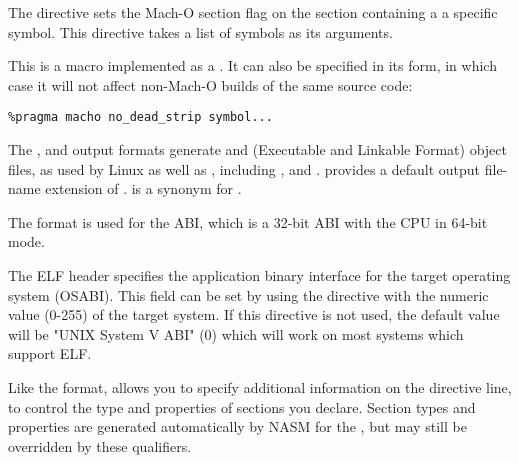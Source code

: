 
The directive  sets the Mach-O 
section flag on the section containing a a specific symbol. This directive takes
a list of symbols as its arguments.

This is a macro implemented as a .  It can also be
specified in its  form, in which case it will not affect
non-Mach-O builds of the same source code:

\begin{lstlisting}
%pragma macho no_dead_strip symbol...
\end{lstlisting}


The ,  and  output formats generate
 and  (Executable and Linkable Format) object files,
as used by Linux as well as , including
,  and .
 provides a default output file-name extension of .
 is a synonym for .

The  format is used for the  ABI, which is
a 32-bit ABI with the CPU in 64-bit mode.


The ELF header specifies the application binary interface for the
target operating system (OSABI). This field can be set by using the
 directive with the numeric value (0-255) of the target
system. If this directive is not used, the default value will be "UNIX
System V ABI" (0) which will work on most systems which support ELF.


Like the  format,  allows you to specify additional
information on the  directive line, to control the type
and properties of sections you declare. Section types and properties
are generated automatically by NASM for the , but may still be overridden by these qualifiers.

